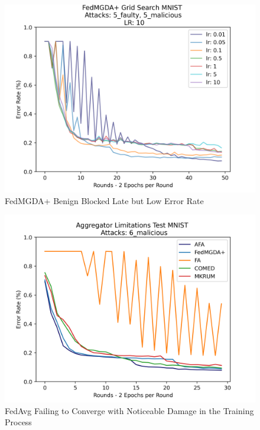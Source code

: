 \begin{figure}[htbp]
	\centering
    \includegraphics[scale=0.5]{initial/graphs/2epoch_grid.png}
	\caption{FedMGDA+ Benign Blocked Late but Low Error Rate}
	\label{fig:2epoch_grid}
\end{figure}

\begin{figure}[htbp]
	\centering
    \includegraphics[scale=0.5]{initial/graphs/6_malicious.png}
	\caption{FedAvg Failing to Converge with Noticeable Damage in the Training Process}
	\label{fig:6mal}
\end{figure}

